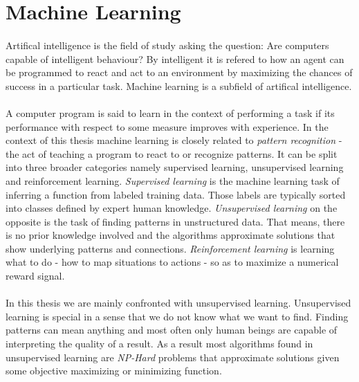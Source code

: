 \section{Machine Learning}
  \paragraph{} Artifical intelligence is the field of study asking the question: Are computers capable of intelligent behaviour? By intelligent it is refered to how an agent can be programmed to react and act to an environment by maximizing the chances of success in a particular task. Machine learning is a subfield of artifical intelligence.

  \paragraph{} A computer program is said to learn in the context of performing a task if its performance with respect to some measure improves with experience. In the context of this thesis machine learning is closely related to \emph{pattern recognition} - the act of teaching a program to react to or recognize patterns. It can be split into three broader categories namely supervised learning, unsupervised learning and reinforcement learning. \emph{Supervised learning} is the machine learning task of inferring a function from labeled training data. Those labels are typically sorted into classes defined by expert human knowledge. \emph{Unsupervised learning} on the opposite is the task of finding patterns in unstructured data. That means, there is no prior knowledge involved and the algorithms approximate solutions that show underlying patterns and connections. \emph{Reinforcement learning} is learning what to do - how to map situations to actions - so as to maximize a numerical reward signal.
  
  \paragraph{} In this thesis we are mainly confronted with unsupervised learning. Unsupervised learning is special in a sense that we do not know what we want to find. Finding patterns can mean anything and most often only human beings are capable of interpreting the quality of a result. As a result most algorithms found in unsupervised learning are \emph{NP-Hard} problems that approximate solutions given some objective maximizing or minimizing function.

